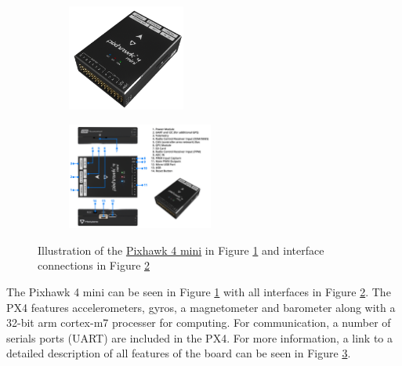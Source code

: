 \documentclass[../Head/report.tex]{subfiles}
\begin{document}
\begin{figure}[H]
    \centering
    \hspace{-6.0em}
    \begin{subfigure}[b]{.4\textwidth}
        \centering
        \includegraphics[height=3.5cm]{../Figures/px4_mini/px4_mini.png}
        \caption{}
        \label{fig:pixhawk_mini_four_board}
    \end{subfigure}
    \begin{subfigure}[b]{.33\textwidth}
        \centering
        \includegraphics[height=3.5cm]{../Figures/px4_mini/px4_mini_interfaces.png}
        \caption{}
        \label{fig:pixhawk_mini_four_interfaces}
    \end{subfigure}
    \caption{Illustration of the \href{https://docs.px4.io/master/en/flight_controller/pixhawk4_mini.html}{Pixhawk 4 mini} in Figure \ref{fig:pixhawk_mini_four_board} and interface connections in Figure \ref{fig:pixhawk_mini_four_interfaces}}
    \label{fig:pixhawk_mini_four}
\end{figure}

The Pixhawk 4 mini can be seen in Figure \ref{fig:pixhawk_mini_four_board} with all interfaces in Figure \ref{fig:pixhawk_mini_four_interfaces}. The PX4 features accelerometers, gyros, a magnetometer and barometer along with a 32-bit arm cortex-m7 processer for computing. For communication, a number of serials ports (UART) are included in the PX4. For more information, a link to a detailed description of all features of the board can be seen in Figure \ref{fig:pixhawk_mini_four}. 
\end{document}
